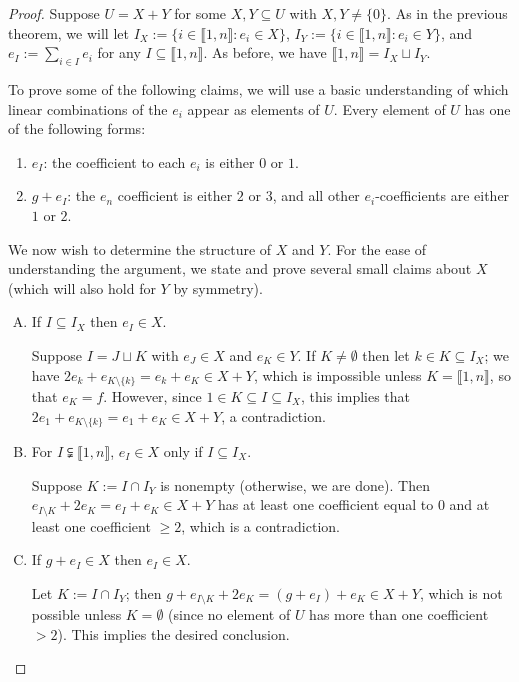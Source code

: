 \documentclass{report}
\newcommand{\llb}{\llbracket}
\newcommand{\rrb}{\rrbracket}
\renewcommand{\:}{\text{:}}
\theoremstyle{definition}
\begin{document}
\begin{proof}
Suppose $U = X + Y$ for some $X,Y\subseteq U$ with $X,Y\neq \{0\}$.
As in the previous theorem, we will let $I_X := \{i\in \llb 1,n \rrb: e_i\in X\}$, $I_Y := \{i\in \llb1,n \rrb: e_i\in Y \}$, and $e_I := \sum_{i\in I}e_i$ for any $I\subseteq \llb 1,n \rrb$.
As before, we have $\llb 1,n \rrb = I_X \sqcup I_Y$.

To prove some of the following claims, we will use a basic understanding of which linear combinations of the $e_i$ appear as elements of $U$.
Every element of $U$ has one of the following forms:
\begin{enumerate}[(F1)]
\item $e_I$: the coefficient to each $e_i$ is either $0$ or $1$.
\item $g+e_I$: the $e_n$ coefficient is either $2$ or $3$, and all other $e_i$-coefficients are either $1$ or $2$.
\end{enumerate}

We now wish to determine the structure of $X$ and $Y$.
For the ease of understanding the argument, we state and prove several small claims about $X$ (which will also hold for $Y$ by symmetry).
\begin{enumerate}[(A)]
\item If $I\subseteq I_X$ then $e_I\in X$. 

Suppose $I = J\sqcup K$ with $e_J\in X$ and $e_K\in Y$.
If $K\neq \emptyset$ then let $k\in K\subseteq I_X$; we have $2e_k + e_{K\setminus\{k\}} = e_k + e_K\in X+Y$, which is impossible unless $K = \llb 1,n\rrb$, so that $e_K = f$.
However, since $1\in K\subseteq I\subseteq I_X$, this implies that $2e_1 + e_{K\setminus\{k\}} = e_1 + e_K\in X+Y$, a contradiction.

\item For $I\subsetneqq \llb 1,n \rrb$, $e_I\in X$ only if $I\subseteq I_X$.

Suppose $K := I \cap I_Y$ is nonempty (otherwise, we are done).
Then $e_{I\setminus K} + 2e_K = e_I + e_K \in X +Y$ has at least one coefficient equal to $0$ and at least one coefficient $\ge 2$, which is a contradiction.

\item If $g + e_I\in X$ then $e_I\in X$. 

Let $K := I\cap I_Y$; then $g + e_{I\setminus K} + 2e_K = (g+e_I) + e_K \in X+Y$, which is not possible unless $K=\emptyset$ (since no element of $U$ has more than one coefficient $>2$).
This implies the desired conclusion.


\end{enumerate}
\end{proof}
\end{document}
